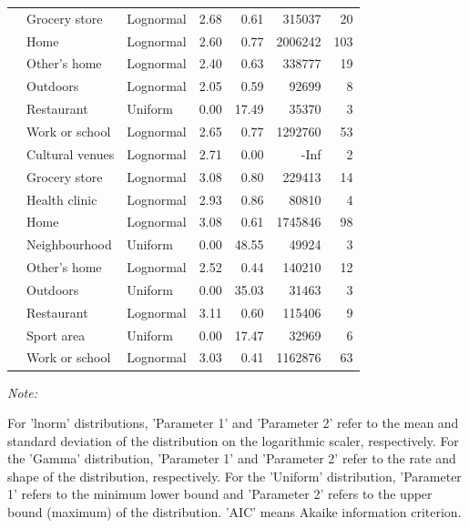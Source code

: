 \documentclass[preprint, 3p,
authoryear]{elsarticle} %
\begin{document}
\begin{table}
{\begin{threeparttable}
\begin{tabular}[t]{rllrrrr}
 & Grocery store & Lognormal & 2.68 & 0.61 & 315037 & 20\\

 & Home & Lognormal & 2.60 & 0.77 & 2006242 & 103\\

 & Other's home & Lognormal & 2.40 & 0.63 & 338777 & 19\\

 & Outdoors & Lognormal & 2.05 & 0.59 & 92699 & 8\\

 & Restaurant & Uniform & 0.00 & 17.49 & 35370 & 3\\

\multirow[t]{-7}{*}{\raggedleft\arraybackslash 2010} & Work or school & Lognormal & 2.65 & 0.77 & 1292760 & 53\\
\cmidrule{1-7}
 & Cultural venues & Lognormal & 2.71 & 0.00 & -Inf & 2\\

 & Grocery store & Lognormal & 3.08 & 0.80 & 229413 & 14\\

 & Health clinic & Lognormal & 2.93 & 0.86 & 80810 & 4\\

 & Home & Lognormal & 3.08 & 0.61 & 1745846 & 98\\

 & Neighbourhood & Uniform & 0.00 & 48.55 & 49924 & 3\\

 & Other's home & Lognormal & 2.52 & 0.44 & 140210 & 12\\

 & Outdoors & Uniform & 0.00 & 35.03 & 31463 & 3\\

 & Restaurant & Lognormal & 3.11 & 0.60 & 115406 & 9\\

 & Sport area & Uniform & 0.00 & 17.47 & 32969 & 6\\

\multirow[t]{-10}{*}{\raggedleft\arraybackslash 2015} & Work or school & Lognormal & 3.03 & 0.41 & 1162876 & 63\\
\bottomrule
\end{tabular}
\begin{tablenotes}
\item \textit{Note: } 
\item For 'lnorm' distributions, 'Parameter 1' and 'Parameter 2' refer to the mean and standard deviation of the distribution on the logarithmic scaler, respectively. For the 'Gamma' distribution, 'Parameter 1' and 'Parameter 2' refer to the rate and shape of the distribution, respectively. For the 'Uniform' distribution,  'Parameter 1' refers to the minimum lower bound and 'Parameter 2'  refers to the upper bound (maximum) of the distribution.  'AIC' means Akaike information criterion.
\end{tablenotes}
\end{threeparttable}}
\end{table}
\end{document}
